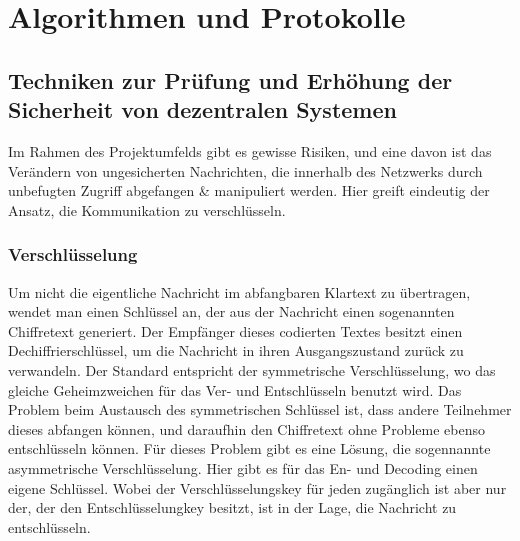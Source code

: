 \documentclass[letterpaper, 12pt]{article}
\let\tempsection\section
\renewcommand\section[1]{\vspace{-0.3cm}\tempsection{#1}\vspace{-0.3cm}}
\let\tempsubsection\subsection
\renewcommand\subsection[1]{\vspace{0cm}\tempsubsection{#1}\vspace{0cm}}
\let\tempsubsubsection\subsubsection
\renewcommand\subsubsection[1]{\vspace{0cm}\tempsubsubsection{#1}\vspace{0cm}}
\begin{document}
\clearpage

\section{Algorithmen und Protokolle}

\subsection{Techniken zur Prüfung und Erhöhung der Sicherheit von dezentralen Systemen}

Im Rahmen des Projektumfelds gibt es gewisse Risiken, und eine davon ist das Verändern von ungesicherten Nachrichten, die innerhalb des Netzwerks durch unbefugten Zugriff abgefangen \& manipuliert werden. Hier greift eindeutig der Ansatz, die Kommunikation zu verschlüsseln. \cite{iotsec}

\subsubsection{Verschlüsselung}

Um nicht die eigentliche Nachricht im abfangbaren Klartext zu übertragen, wendet man einen Schlüssel an, der aus
der Nachricht einen sogenannten Chiffretext generiert. Der Empfänger dieses codierten
Textes besitzt einen Dechiffrierschlüssel, um die Nachricht in ihren Ausgangszustand zurück zu
verwandeln. Der Standard entspricht der symmetrische Verschlüsselung, wo das gleiche
Geheimzweichen für das Ver- und Entschlüsseln benutzt wird. Das Problem beim Austausch
des symmetrischen Schlüssel ist, dass andere Teilnehmer dieses abfangen können, und daraufhin den Chiffretext ohne Probleme ebenso entschlüsseln können.
Für dieses Problem gibt es eine Lösung, die sogennannte asymmetrische Verschlüsselung.
Hier gibt es für das En- und Decoding einen eigene Schlüssel. Wobei der Verschlüsselungskey
für jeden zugänglich ist aber nur der, der den Entschlüsselungkey besitzt, ist in der
Lage, die Nachricht zu entschlüsseln. \cite{ausarbeitungsec}
\end{document}
